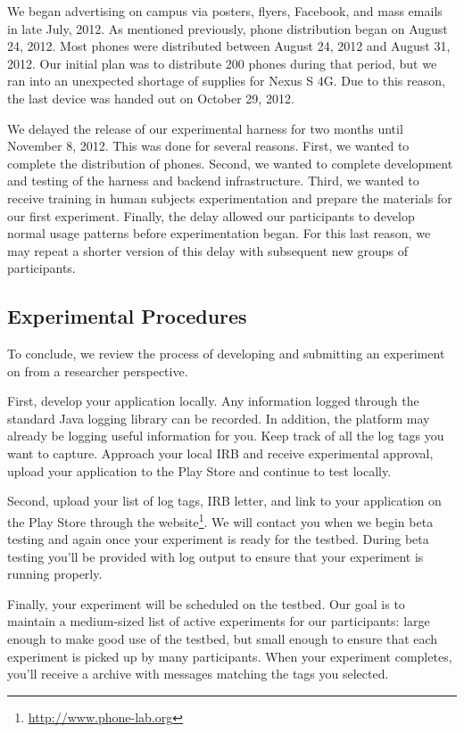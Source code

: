 We began advertising \PhoneLab{} on campus via posters, flyers, Facebook, and
mass emails in late July, 2012. As mentioned previously, \PhoneLab{} phone
distribution began on August 24, 2012. Most phones were distributed between
August 24, 2012 and August 31, 2012. Our initial plan was to distribute 200
phones during that period, but we ran into an unexpected shortage of
supplies for Nexus S 4G. Due to this reason, the last device was handed out on
October 29, 2012.

We delayed the release of our experimental harness for two months until
November 8, 2012. This was done for several reasons. First, we wanted to
complete the distribution of phones. Second, we wanted to complete development
and testing of the harness and backend infrastructure. Third, we wanted to
receive training in human subjects experimentation and prepare the materials for
our first experiment. Finally, the delay allowed our participants to develop
normal usage patterns before experimentation began. For this last reason, we may
repeat a shorter version of this delay with subsequent new groups of \PhoneLab{}
participants.

\subsection{Experimental Procedures}

To conclude, we review the process of developing and submitting an experiment
on \PhoneLab{} from a researcher perspective.

First, develop your application locally. Any information logged through the
standard Java logging library can be recorded. In addition, the platform may
already be logging useful information for you. Keep track of all the log tags
you want \PhoneLab{} to capture. Approach your local IRB and receive
experimental approval, upload your application to the Play Store and continue
to test locally.

Second, upload your list of log tags, IRB letter, and link to your
application on the Play Store through the \PhoneLab{}
website\footnote{\url{http://www.phone-lab.org}}. We will contact you when we
begin beta testing and again once your experiment is ready for the testbed.
During beta testing you'll be provided with \PhoneLab{} log output to ensure
that your experiment is running properly.

Finally, your experiment will be scheduled on the testbed. Our goal is to
maintain a medium-sized list of active experiments for our participants:
large enough to make good use of the testbed, but small enough to ensure that
each experiment is picked up by many participants. When your experiment
completes, you'll receive a archive with messages matching the tags you
selected.

